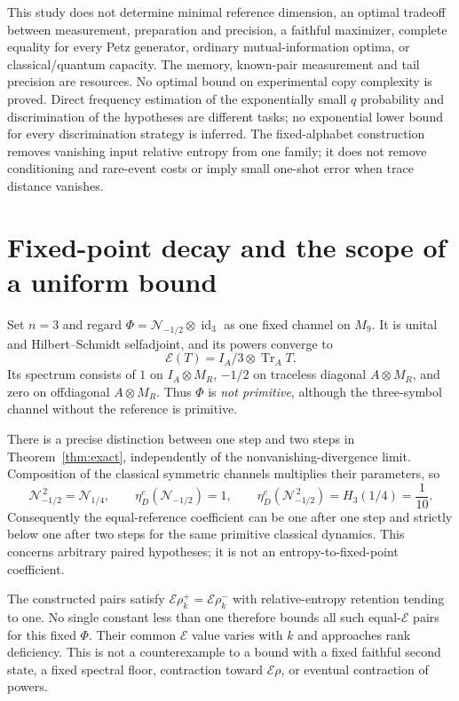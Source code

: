 \documentclass[11pt]{article}
\theoremstyle{remark}\newtheorem{remark}[theorem]{Remark}
\newcommand{\Tr}{\operatorname{Tr}}
\newcommand{\id}{\operatorname{id}}
\newcommand{\N}{\mathcal N}
\begin{document}
This study does not determine minimal reference dimension, an optimal tradeoff between measurement, preparation and precision, a faithful maximizer, complete equality for every Petz generator, ordinary mutual-information optima, or classical/quantum capacity. The memory, known-pair measurement and tail precision are resources. No optimal bound on experimental copy complexity is proved. Direct frequency estimation of the exponentially small $q$ probability and discrimination of the hypotheses are different tasks; no exponential lower bound for every discrimination strategy is inferred. The fixed-alphabet construction removes vanishing input relative entropy from one family; it does not remove conditioning and rare-event costs or imply small one-shot error when trace distance vanishes.

\section{Fixed-point decay and the scope of a uniform bound}
Set $n=3$ and regard $\Phi=\N_{-1/2}\otimes\id_3$ as one fixed channel on $M_9$. It is unital and Hilbert--Schmidt selfadjoint, and its powers converge to
\[
 \mathcal E(T)=I_A/3\otimes\Tr_A T.
\]
Its spectrum consists of $1$ on $I_A\otimes M_R$, $-1/2$ on traceless diagonal $A\otimes M_R$, and zero on offdiagonal $A\otimes M_R$. Thus $\Phi$ is \emph{not primitive}, although the three-symbol channel without the reference is primitive.

There is a precise distinction between one step and two steps in Theorem~\ref{thm:exact}, independently of the nonvanishing-divergence limit. Composition of the classical symmetric channels multiplies their parameters, so
\[
 \N_{-1/2}^{\,2}=\N_{1/4},\qquad
 \eta_D^c(\N_{-1/2})=1,\qquad
 \eta_D^c(\N_{-1/2}^{\,2})=H_3(1/4)=\frac1{10}.
\]
Consequently the equal-reference coefficient can be one after one step and strictly below one after two steps for the same primitive classical dynamics. This concerns arbitrary paired hypotheses; it is not an entropy-to-fixed-point coefficient.

The constructed pairs satisfy $\mathcal E\rho_k^+=\mathcal E\rho_k^-$ with relative-entropy retention tending to one. No single constant less than one therefore bounds all such equal-$\mathcal E$ pairs for this fixed $\Phi$. Their common $\mathcal E$ value varies with $k$ and approaches rank deficiency. This is not a counterexample to a bound with a fixed faithful second state, a fixed spectral floor, contraction toward $\mathcal E\rho$, or eventual contraction of powers.
\end{document}

